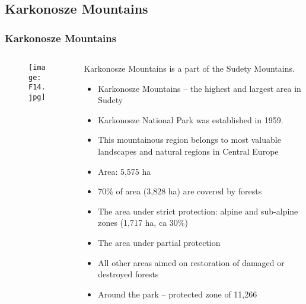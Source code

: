 \documentclass[pdflatex,compress,8pt,
	xcolor={dvipsnames,dvipsnames,svgnames,x11names,table},
	hyperref={colorlinks = true,
	breaklinks = true, urlcolor = NavyBlue, breaklinks = true}]{beamer}
\begin{document}
\subsection{Karkonosze Mountains}
\begin{frame}\frametitle{Karkonosze Mountains}
\begin{minipage}[0.4\textheight]{\textwidth}
\begin{columns}[T]
\begin{column}{0.4\textwidth}
\vspace{8em}
\begin{figure}[H]
	\centering
		\texttt{[image: F14.jpg]}
\end{figure}
\end{column}
\begin{column}{0.6\textwidth}
\vspace{6em} 
Karkonosze Mountains is a part of the Sudety Mountains. 
\begin{itemize}
	\item Karkonosze Mountains – the highest and largest area in Sudety
	\item Karkonosze National Park was established in 1959.
	\item This mountainous region belongs to most valuable landscapes and natural regions in Central Europe 
	\item Area: 5,575 ha
	\item 70\% of area (3,828 ha) are covered by forests
	\item The area under strict protection: alpine and sub-alpine zones (1,717 ha, ca 30\%)
	\item The area under partial protection\
	\item All other areas aimed on restoration of damaged or destroyed forests 
	\item Around the park – protected zone of 11,266 
\end{itemize}
\end{column}
\end{columns}
\end{minipage}
\end{frame}
\end{document}
